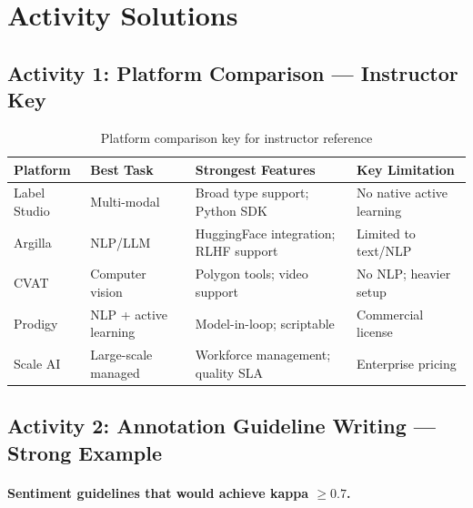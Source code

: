 \section{Activity Solutions}

\subsection{Activity 1: Platform Comparison --- Instructor Key}

\begin{table}[htbp]
\caption{Platform comparison key for instructor reference}
\label{tab:platform-comparison-key}
\centering
\begin{tabular}{@{}p{2.5cm}p{2.5cm}p{2.5cm}p{2.5cm}@{}}
\toprule
\textbf{Platform} & \textbf{Best Task} & \textbf{Strongest Features} & \textbf{Key Limitation} \\
\midrule
Label Studio & Multi-modal & Broad type support; Python SDK & No native active learning \\
Argilla & NLP/LLM & HuggingFace integration; RLHF support & Limited to text/NLP \\
CVAT & Computer vision & Polygon tools; video support & No NLP; heavier setup \\
Prodigy & NLP + active learning & Model-in-loop; scriptable & Commercial license \\
Scale AI & Large-scale managed & Workforce management; quality SLA & Enterprise pricing \\
\bottomrule
\end{tabular}
\end{table}

\subsection{Activity 2: Annotation Guideline Writing --- Strong Example}

\paragraph{Sentiment guidelines that would achieve kappa $\geq 0.7$.}

